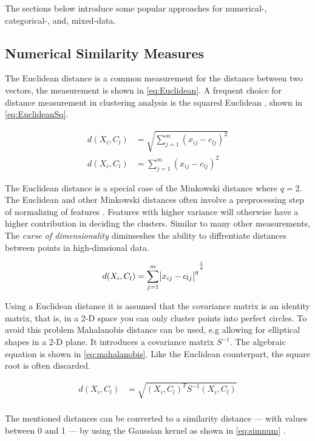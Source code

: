 \documentclass[../report.tex]{subfiles}
\begin{document}
The sections below introduce some popular approaches for numerical-, categorical-, and, mixed-data.

\subsection{Numerical Similarity Measures}

The Euclidean distance is a common measurement for the distance between two vectors, the measurement is shown in \ref{eq:Euclidean}. A frequent choice for distance measurement in clustering analysis is the squared Euclidean \cite{Jain1999, Huang1998, huang2005automated}, shown in \ref{eq:EuclideanSq}.

\begin{align}
  \label{eq:Euclidean}
  d(X_i,C_l) &= \sqrt{\sum^{m}_{j=1}(x_{ij} - c_{lj})^2} \\
  \label{eq:EuclideanSq}
  d(X_i,C_l) &= \sum^{m}_{j=1}(x_{ij} - c_{lj})^2
\end{align}

The Euclidean distance is a special case of the Minkowski distance where $q=2$. The Euclidean and other Minkowski distances often involve a preprocessing step of normalizing of features \cite{Jain1999}. Features with higher variance will otherwise have a higher contribution in deciding the clusters. Similar to many other measurements, The \textit{curse of dimensionality} diminseshes the ability to diffrentiate distances between points in high-dimsional data\cite{Parsons2004}.

\begin{align}
  \label{eq:mikowski}
  d(X_i,C_l) &= {\sum^{m}_{j=1}\abs{x_{ij} - c_{lj}}^q}^{\frac{1}{q}}
\end{align}

Using a Euclidean distance it is assumed that the covariance matrix is an identity matrix, that is, in a 2-D space you can only cluster points into perfect circles. To avoid this problem Mahalanobis distance can be used, e.g allowing for elliptical shapes in a 2-D plane. It introduces a covariance matrix $S^{-1}$. The algebraic equation is shown in \ref{eq:mahalanobis}. Like the Euclidean counterpart, the square root is often discarded. 

\begin{align}
  \label{eq:mahalanobis}
  d(X_i,C_l) &= \sqrt{(X_i, C_l)^T S^{-1} (X_i, C_l)} \\
\end{align}

The mentioned distances can be converted to a similarity distance --- with values between 0 and 1 --- by using the Gaussian kernel as shown in \ref{eq:simnum} \cite{Cheung2013}.
\end{document}
